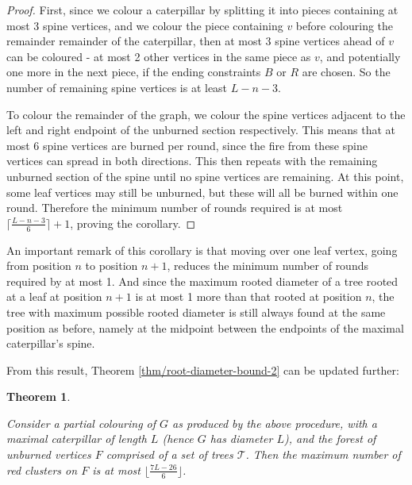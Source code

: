 \documentclass{mpaper}
\newtheorem{theorem}{Theorem}[section]
\begin{document}
\begin{proof}
First, since we colour a caterpillar by splitting it into pieces containing at most 3 spine vertices, and we colour the piece containing $v$ before colouring the remainder remainder of the caterpillar, then at most 3 spine vertices ahead of $v$ can be coloured - at most 2 other vertices in the same piece as $v$, and potentially one more in the next piece, if the ending constraints $B$ or $R$ are chosen. So the number of remaining spine vertices is at least $L - n - 3$.

To colour the remainder of the graph, we colour the spine vertices adjacent to the left and right endpoint of the unburned section respectively. This means that at most 6 spine vertices are burned per round, since the fire from these spine vertices can spread in both directions. This then repeats with the remaining unburned section of the spine until no spine vertices are remaining. At this point, some leaf vertices may still be unburned, but these will all be burned within one round. Therefore the minimum number of rounds required is at most $\lceil \frac{L-n-3}{6} \rceil + 1$, proving the corollary.
\end{proof}

An important remark of this corollary is that moving over one leaf vertex, going from position $n$ to position $n+1$, reduces the minimum number of rounds required by at most 1. And since the maximum rooted diameter of a tree rooted at a leaf at position $n+1$ is at most 1 more than that rooted at position $n$, the tree with maximum possible rooted diameter is still always found at the same position as before, namely at the midpoint between the endpoints of the maximal caterpillar's spine.

From this result, Theorem \ref{thm/root-diameter-bound-2} can be updated further:

\begin{theorem}
  \label{thm/root-diameter-bound-3}
  
  Consider a partial colouring of $G$ as produced by the above procedure, with a maximal caterpillar of length $L$ (hence $G$ has diameter $L$), and the forest of unburned vertices $F$ comprised of a set of trees $\mathcal{T}$. Then the maximum number of red clusters on $F$ is at most $\lfloor \frac{7L-26}{6} \rfloor$.
  
\end{theorem}
  
\end{document}
